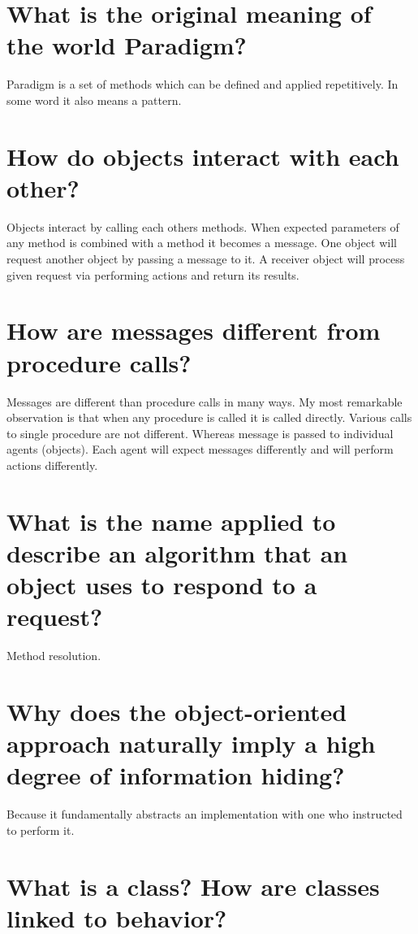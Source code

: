 \section {
  What is the original meaning of the world Paradigm?
}

Paradigm is a set of methods which can be defined and applied repetitively. In
some word it also means a pattern.


\section {
  How do objects interact with each other?
}

Objects interact by calling each others methods. When expected parameters of
any method is combined with a method it becomes a message. One object will
request another object by passing a message to it. A receiver object will
process given request via performing actions and return its results.

\section {
  How are messages different from procedure calls?
}

Messages are different than procedure calls in many ways. My most remarkable
observation is that when any procedure is called it is called directly. Various
calls to single procedure are not different. Whereas message is passed to
individual agents (objects). Each agent will expect messages differently and
will perform actions differently.

\section {
  What is the name applied to describe an algorithm that an object uses to
  respond to a request?
}

Method resolution.

\section {
  Why does the object-oriented approach naturally imply a high degree of
  information hiding?
}

Because it fundamentally abstracts an implementation with one who instructed to
perform it.

\section {
  What is a class? How are classes linked to behavior?
}

